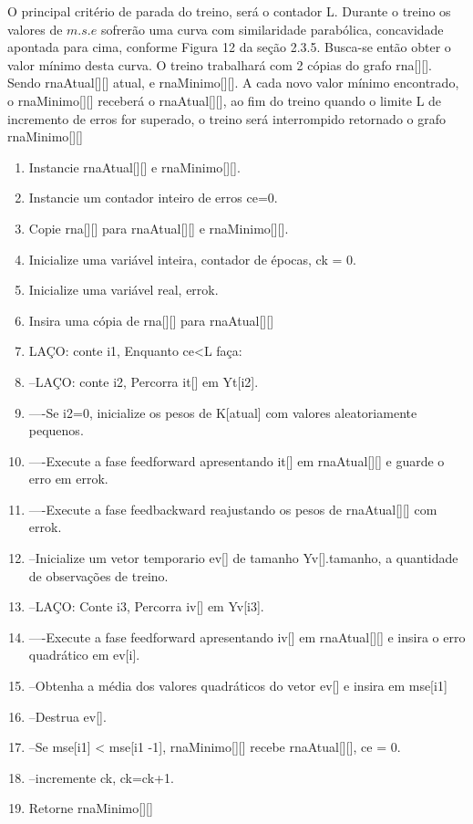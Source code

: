 \documentclass[	12pt, Times, openright, twoside, a4paper, english, brazil]{abntex2}
\begin{document}
            O principal critério de parada do treino, será o contador L.
            Durante o treino os valores de $m.s.e$ sofrerão uma curva com similaridade parabólica, concavidade apontada para cima, conforme Figura 12 da seção 2.3.5. Busca-se então obter o valor mínimo desta curva.
            O treino trabalhará com 2 cópias do grafo rna[][]. Sendo rnaAtual[][] atual, e rnaMinimo[][].
			A cada novo valor mínimo encontrado, o rnaMinimo[][] receberá o rnaAtual[][], ao fim do treino quando o limite L de incremento de erros for superado, o treino será interrompido retornado o grafo rnaMinimo[][]

            \begin{enumerate}
                \item Instancie rnaAtual[][] e rnaMinimo[][].
                \item Instancie um contador inteiro de erros ce=0.
                \item Copie rna[][] para rnaAtual[][] e rnaMinimo[][].
                \item Inicialize uma variável inteira, contador de épocas, ck = 0.
                \item Inicialize uma variável real, errok.
                \item Insira uma cópia de rna[][] para rnaAtual[][]
                
                \item LAÇO: conte i1, Enquanto ce<L faça:
                \item --LAÇO: conte i2, Percorra it[] em Yt[i2].
                \item ----Se i2=0, inicialize os pesos de K[atual] com valores aleatoriamente pequenos. 
                \item ----Execute a fase feedforward apresentando it[] em rnaAtual[][] e guarde o erro em errok.
                \item ----Execute a fase feedbackward reajustando os pesos de rnaAtual[][] com errok.

                \item --Inicialize um vetor temporario ev[] de tamanho Yv[].tamanho, a quantidade de observações de treino.

                \item --LAÇO: Conte i3, Percorra iv[] em Yv[i3].
                \item ----Execute a fase feedforward apresentando iv[] em rnaAtual[][] e insira o erro quadrático em ev[i].

                \item --Obtenha a média dos valores quadráticos do vetor ev[] e insira em mse[i1]
                \item --Destrua ev[].
                \item --Se mse[i1] < mse[i1 -1], rnaMinimo[][] recebe rnaAtual[][], ce = 0.
                \item --incremente ck, ck=ck+1.
                \item Retorne rnaMinimo[][]
            \end{enumerate}
\end{document}
